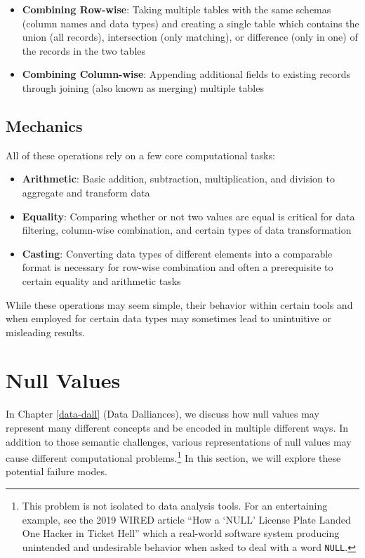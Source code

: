 \documentclass[
]{krantz}
\providecommand{\tightlist}{%
  \setlength{\itemsep}{0pt}\setlength{\parskip}{0pt}}
\begin{document}
\begin{itemize}
\tightlist
\item
  \textbf{Combining Row-wise}: Taking multiple tables with the same schemas (column names and data types) and creating a single table which contains the union (all records), intersection (only matching), or difference (only in one) of the records in the two tables
\item
  \textbf{Combining Column-wise}: Appending additional fields to existing records through joining (also known as merging) multiple tables
\end{itemize}

\hypertarget{mechanics}{%
\subsection{Mechanics}\label{mechanics}}

All of these operations rely on a few core computational tasks:

\begin{itemize}
\tightlist
\item
  \textbf{Arithmetic}: Basic addition, subtraction, multiplication, and division to aggregate and transform data
\item
  \textbf{Equality}: Comparing whether or not two values are equal is critical for data filtering, column-wise combination, and certain types of data transformation
\item
  \textbf{Casting}: Converting data types of different elements into a comparable format is necessary for row-wise combination and often a prerequisite to certain equality and arithmetic tasks
\end{itemize}

While these operations may seem simple, their behavior within certain tools and when employed for certain data types may sometimes lead to unintuitive or misleading results.

\hypertarget{null-values}{%
\section{Null Values}\label{null-values}}

In Chapter \ref{data-dall} (Data Dalliances), we discuss how null values may represent many different concepts and be encoded in multiple different ways.
In addition to those semantic challenges, various representations of null values may cause different computational problems.\footnote{This problem is not isolated to data analysis tools. For an entertaining example, see the 2019 WIRED article ``How a `NULL' License Plate Landed One Hacker in Ticket Hell'' \citep{barrett} which a real-world software system producing unintended and undesirable behavior when asked to deal with a word \texttt{\textquotesingle{}NULL\textquotesingle{}}.}
In this section, we will explore these potential failure modes.
\end{document}
